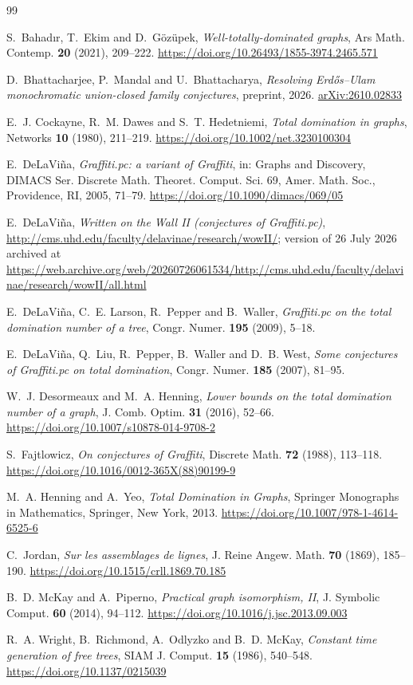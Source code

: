 \documentclass[11pt]{amsart}
\theoremstyle{definition}
\theoremstyle{remark}
\numberwithin{equation}{section}
\providecommand{\doi}[1]{\url{https://doi.org/#1}}
\begin{document}
{\raggedright
\begin{thebibliography}{99}

S.~Bahad\i r, T.~Ekim and D.~G\"oz\"upek, \emph{Well-totally-dominated graphs}, Ars Math. Contemp. \textbf{20} (2021), 209--222. \doi{10.26493/1855-3974.2465.571}

D.~Bhattacharjee, P.~Mandal and U.~Bhattacharya, \emph{Resolving Erd\H{o}s--Ulam monochromatic union-closed family conjectures}, preprint, 2026. \href{https://arxiv.org/abs/2610.02833}{arXiv:2610.02833}

E.~J. Cockayne, R.~M. Dawes and S.~T. Hedetniemi, \emph{Total domination in graphs}, Networks \textbf{10} (1980), 211--219. \doi{10.1002/net.3230100304}

E.~DeLaVi\~na, \emph{Graffiti.pc: a variant of Graffiti}, in: Graphs and Discovery, DIMACS Ser. Discrete Math. Theoret. Comput. Sci. 69, Amer. Math. Soc., Providence, RI, 2005, 71--79. \doi{10.1090/dimacs/069/05}

E.~DeLaVi\~na, \emph{Written on the Wall II (conjectures of Graffiti.pc)}, \url{http://cms.uhd.edu/faculty/delavinae/research/wowII/}; version of 26 July 2026 archived at \url{https://web.archive.org/web/20260726061534/http://cms.uhd.edu/faculty/delavinae/research/wowII/all.html}

E.~DeLaVi\~na, C.~E. Larson, R.~Pepper and B.~Waller, \emph{Graffiti.pc on the total domination number of a tree}, Congr. Numer. \textbf{195} (2009), 5--18.

E.~DeLaVi\~na, Q.~Liu, R.~Pepper, B.~Waller and D.~B. West, \emph{Some conjectures of Graffiti.pc on total domination}, Congr. Numer. \textbf{185} (2007), 81--95.

W.~J. Desormeaux and M.~A. Henning, \emph{Lower bounds on the total domination number of a graph}, J. Comb. Optim. \textbf{31} (2016), 52--66. \doi{10.1007/s10878-014-9708-2}

S.~Fajtlowicz, \emph{On conjectures of Graffiti}, Discrete Math. \textbf{72} (1988), 113--118. \doi{10.1016/0012-365X(88)90199-9}

M.~A. Henning and A.~Yeo, \emph{Total Domination in Graphs}, Springer Monographs in Mathematics, Springer, New York, 2013. \doi{10.1007/978-1-4614-6525-6}

C.~Jordan, \emph{Sur les assemblages de lignes}, J. Reine Angew. Math. \textbf{70} (1869), 185--190. \doi{10.1515/crll.1869.70.185}

B.~D. McKay and A.~Piperno, \emph{Practical graph isomorphism, II}, J. Symbolic Comput. \textbf{60} (2014), 94--112. \doi{10.1016/j.jsc.2013.09.003}

R.~A. Wright, B.~Richmond, A.~Odlyzko and B.~D. McKay, \emph{Constant time generation of free trees}, SIAM J. Comput. \textbf{15} (1986), 540--548. \doi{10.1137/0215039}

\end{thebibliography}
}
\end{document}
